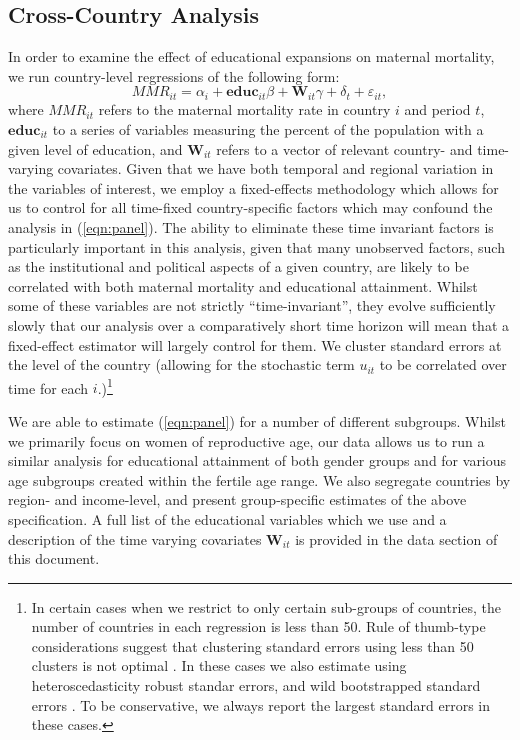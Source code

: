 \documentclass{article}[12pt,subeqn]
\begin{document}
\begin{spacing}{1.4}
\subsection{Cross-Country Analysis}
In order to examine the effect of educational expansions on maternal mortality, 
we run country-level regressions of the following form:
\begin{equation}
\label{eqn:panel}
   MMR_{it}=\alpha_i+\mathbf{educ}_{it}\beta + \mathbf{W}_{it}\gamma+\delta_t+
   \varepsilon_{it},
\end{equation}
where $MMR_{it}$ refers to the maternal mortality rate in country $i$ and period 
$t$, $\mathbf{educ}_{it}$ to a series of variables measuring the percent of the 
population with a given level of education, and $\mathbf{W}_{it}$ refers to a 
vector of relevant country- and time-varying covariates.  Given that we have both 
temporal and regional variation in the variables of interest, we employ a 
fixed-effects methodology which allows for us to control for all time-fixed 
country-specific factors which may confound the analysis in (\ref{eqn:panel}).
The ability to eliminate these time invariant factors is particularly important 
in this analysis, given that many unobserved factors, such as the institutional 
and political aspects of a given country, are likely to be correlated with both 
maternal mortality and educational attainment. Whilst some of these variables are 
not strictly ``time-invariant'', they evolve sufficiently slowly that our analysis 
over a comparatively short time horizon will mean that a fixed-effect estimator 
will largely control for them. We cluster standard errors at the level of the 
country (allowing for the stochastic term $u_{it}$ to be correlated over time for 
each $i$.)\footnote{In certain cases when we restrict to only certain sub-groups
of countries, the number of countries in each regression is less than 50.  Rule
of thumb-type considerations suggest that clustering standard errors using less
than 50 clusters is not optimal \citep{AngristPischke2009,NicholsSchaffer2007}.  
In these cases we also estimate using heteroscedasticity robust standar errors, 
and wild bootstrapped standard errors \citep{MackinnonWebb2014}. To be 
conservative, we always report the largest standard errors in these cases.}

We are able to estimate (\ref{eqn:panel}) for a number of different subgroups. 
Whilst we primarily focus on women of reproductive age, our data allows us to run 
a similar analysis for educational attainment of both gender groups and for 
various age subgroups created within the fertile age range. We also segregate 
countries by region- and income-level, and present group-specific estimates of the 
above specification. A full list of the educational variables which we use and a 
description of the time varying covariates $\textbf{W}_{it}$ is provided in the 
data section of this document.


\end{spacing}
\end{document}
